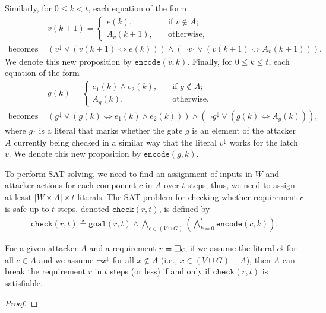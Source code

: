 {Similarly, for $0\leq k<t$, each equation of the form 
\begin{align*}
&v(k+1) = \begin{cases}
e(k), \quad &\text{if $v\not \in A$;}\\
A_v(k+1), \quad &\text{otherwise},
\end{cases}\quad
\\\text{becomes }
&\left(v^{\downarrow} \lor (v(k+1) \Leftrightarrow e(k) ) \right)\land \left(\lnot v^{\downarrow} \lor (v(k+1) \Leftrightarrow A_v(k+1)) \right).
\end{align*}
We denote this new proposition by $\mathtt{encode}(v,k)$. %
Finally, for $0\leq k \leq t$, each equation of the form
\begin{align*}
&g(k) = \begin{cases}
e_1(k)\land e_2(k), \quad &\text{if $g\not \in A$;}\\
A_g(k), \quad &\text{otherwise},
\end{cases}\\\text{becomes }
&\left(g^{\downarrow} \lor (g(k) \Leftrightarrow e_1(k)\land e_2(k) ) \right)\land \left(\lnot g^{\downarrow} \lor (g(k) \Leftrightarrow A_g(k)) \right),
\end{align*}
where $g^{\downarrow}$ is a literal that marks whether the gate $g$ is an element of the attacker $A$ currently being checked in a similar way that the literal $v^\downarrow$ works for the latch $v$. We denote this new proposition by $\mathtt{encode}(g,k)$.

To perform SAT solving, we need to find an assignment of inputs in $W$ and attacker actions for each component $c$ in $A$ over $t$ steps; thus, we need to assign at least ${|W\times A|\times t}$ literals. The SAT problem for checking whether requirement $r$ is safe up to $t$ steps, denoted $\mathtt{check}(r,t)$, is defined by 
\begin{align}
\label{eq:naiveCheck}
\mathtt{check}(r,t)\triangleq\mathtt{goal}(r,t)\land\! \bigwedge_{c\in (V \cup G)}\left( \bigwedge_{k=0}^{t}{\mathtt{encode}(c,k)}\right).
\end{align}
\begin{proposition}
\label{prop:Correctness}
For a given attacker $A$ and a requirement $r={{\square}} e$, if we assume the literal $c^{\downarrow}$ for all $c \in A$ and we assume $\lnot x^{\downarrow}$ for all $x\not\in A$ (i.e., $x\in (V \cup G)-A$), then $A$ can break the requirement $r$ in $t$ steps (or less) if and only if $\mathtt{check}(r,t)$ is satisfiable.
\end{proposition}
\begin{proof}


\end{proof}}
